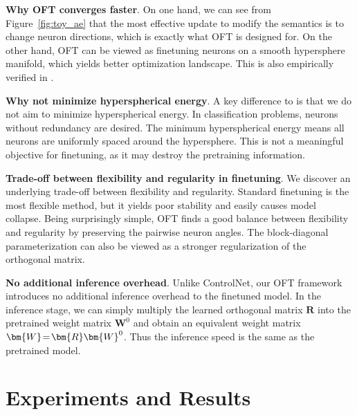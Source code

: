 \vspace{-0.4mm}


\textbf{Why OFT converges faster}. On one hand, we can see from Figure~\ref{fig:toy_ae} that the most effective update to modify the semantics is to change neuron directions, which is exactly what OFT is designed for. On the other hand, OFT can be viewed as finetuning neurons on a smooth hypersphere manifold, which yields better optimization landscape. This is also empirically verified in \cite{liu2021orthogonal}.

\vspace{-0.4mm}


\textbf{Why not minimize hyperspherical energy}. A key difference to \cite{liu2021orthogonal} is that we do not aim to minimize hyperspherical energy. In classification problems, neurons without redundancy are desired. The minimum hyperspherical energy means all neurons are uniformly spaced around the hypersphere. This is not a meaningful objective for finetuning, as it may destroy the pretraining information.

\vspace{-0.4mm}


\textbf{Trade-off between flexibility and regularity in finetuning}. We discover an underlying trade-off between flexibility and regularity. Standard finetuning is the most flexible method, but it yields poor stability and easily causes model collapse. Being surprisingly simple, OFT finds a good balance between flexibility and regularity by preserving the pairwise neuron angles. The block-diagonal parameterization can also be viewed as a stronger regularization of the orthogonal matrix. 

\vspace{-0.4mm}


\textbf{No additional inference overhead}. Unlike ControlNet, our OFT framework introduces no additional inference overhead to the finetuned model. In the inference stage, we can simply multiply the learned orthogonal matrix $\bm{R}$ into the pretrained weight matrix $\bm{W}^0$ and obtain an equivalent weight matrix $\thickmuskip=2mu \medmuskip=2mu \bm{W}=\bm{R}\bm{W}^0$. Thus the inference speed is the same as the pretrained model.


\vspace{-2.05mm}
\section{Experiments and Results}
\vspace{-1.75mm}



